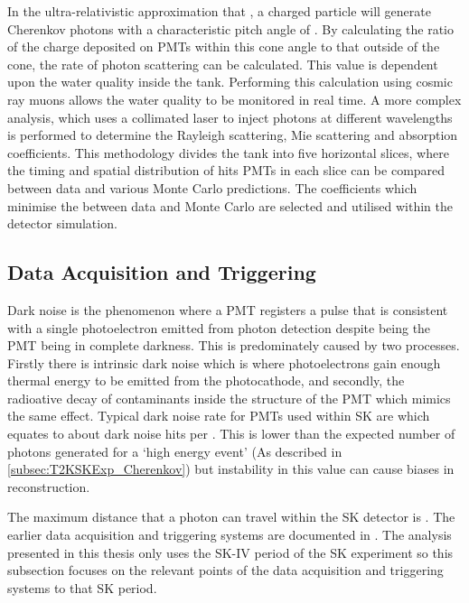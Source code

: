 In the ultra-relativistic approximation that , a charged particle will generate Cherenkov photons with a characteristic pitch angle of . By calculating the ratio of the charge deposited on PMTs within this cone angle to that outside of the cone, the rate of photon scattering can be calculated. This value is dependent upon the water quality inside the tank. Performing this calculation using cosmic ray muons allows the water quality to be monitored in real time. A more complex analysis, which uses a collimated laser to inject photons at different wavelengths is performed to determine the Rayleigh scattering, Mie scattering and absorption coefficients. This methodology divides the tank into five horizontal slices, where the timing and spatial distribution of hits PMTs in each slice can be compared between data and various Monte Carlo predictions. The coefficients which minimise the  between data and Monte Carlo are selected and utilised within the detector simulation. 

\subsection{Data Acquisition and Triggering}
\label{subsec:T2KSKExp_SKTriggering}

Dark noise is the phenomenon where a PMT registers a pulse that is consistent with a single photoelectron emitted from photon detection despite being the PMT being in complete darkness. This is predominately caused by two processes. Firstly there is intrinsic dark noise which is where photoelectrons gain enough thermal energy to be emitted from the photocathode, and secondly, the radioative decay of contaminants inside the structure of the PMT which mimics the same effect. Typical dark noise rate for PMTs used within SK are  \cite{Fukuda2003-ly} which equates to about  dark noise hits per  \cite{Carminati2015-zx}. This is lower than the expected number of photons generated for a `high energy event' (As described in \autoref{subsec:T2KSKExp_Cherenkov}) but instability in this value can cause biases in reconstruction.

The maximum distance that a photon can travel within the SK detector is  \cite{PhysRevD.73.112001}. The earlier data acquisition and triggering systems are documented in \cite{34489,PhysRevD.73.112001}. The analysis presented in this thesis only uses the SK-IV period of the SK experiment so this subsection focuses on the relevant points of the data acquisition and triggering systems to that SK period.

